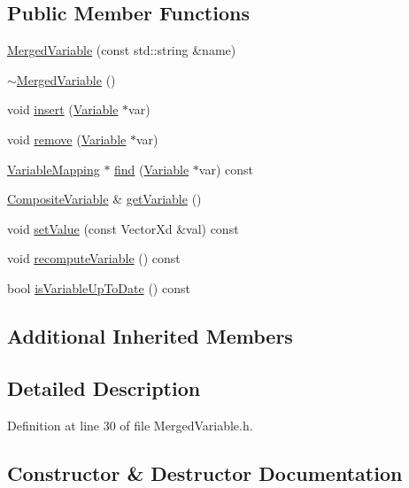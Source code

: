 \subsection*{Public Member Functions}
\begin{DoxyCompactItemize}
\item 
\hyperlink{classocra_1_1MergedVariable_ac6dcd7217ac6a6097ae95f5fe2afc513}{Merged\+Variable} (const std\+::string \&name)
\item 
\hyperlink{classocra_1_1MergedVariable_aa126050631c068dba3e1d12f31dea9ec}{$\sim$\+Merged\+Variable} ()
\item 
void \hyperlink{classocra_1_1MergedVariable_aa91f4ed9514c3dd4bf1ae4e25cf1e118}{insert} (\hyperlink{classocra_1_1Variable}{Variable} $\ast$var)
\item 
void \hyperlink{classocra_1_1MergedVariable_ae0a14af6f9fb0b0dc72d6023e7e40069}{remove} (\hyperlink{classocra_1_1Variable}{Variable} $\ast$var)
\item 
\hyperlink{classocra_1_1VariableMapping}{Variable\+Mapping} $\ast$ \hyperlink{classocra_1_1MergedVariable_a54dea5dde63addca4de73ea8fdb6073b}{find} (\hyperlink{classocra_1_1Variable}{Variable} $\ast$var) const
\item 
\hyperlink{classocra_1_1CompositeVariable}{Composite\+Variable} \& \hyperlink{classocra_1_1MergedVariable_afa4986407c3fbaebe268fd248b2c4bcf}{get\+Variable} ()
\item 
void \hyperlink{classocra_1_1MergedVariable_a2c53faf60a0aa267457aa6688b7341aa}{set\+Value} (const Vector\+Xd \&val) const
\item 
void \hyperlink{classocra_1_1MergedVariable_a5edb99e2c6596addb6b5a1c991f79699}{recompute\+Variable} () const
\item 
bool \hyperlink{classocra_1_1MergedVariable_a1da61e970d1c32c9ad94da57914d5aeb}{is\+Variable\+Up\+To\+Date} () const
\end{DoxyCompactItemize}
\subsection*{Additional Inherited Members}


\subsection{Detailed Description}


Definition at line 30 of file Merged\+Variable.\+h.



\subsection{Constructor \& Destructor Documentation}
\hypertarget{classocra_1_1MergedVariable_ac6dcd7217ac6a6097ae95f5fe2afc513}{}\label{classocra_1_1MergedVariable_ac6dcd7217ac6a6097ae95f5fe2afc513} 
